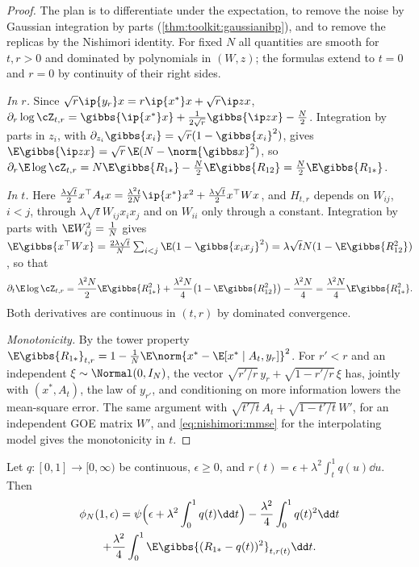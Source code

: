\begin{refsection}
\begin{proof}
The plan is to differentiate under the expectation, to remove the noise by Gaussian integration by parts (\cref{thm:toolkit:gaussianibp}), and to remove the replicas by the Nishimori identity. For fixed $N$ all quantities are smooth for $t,r>0$ and dominated by polynomials in $(W,z)$; the formulas extend to $t=0$ and $r=0$ by continuity of their right sides.

\emph{In $r$.} Since $\sqrt r\ip{y_r}x=r\ip{x^*}x+\sqrt r\ip zx$, $\partial_r\log\cZ_{t,r}=\gibbs{\ip{x^*}x}+\frac1{2\sqrt r}\gibbs{\ip zx}-\frac N2$. Integration by parts in $z_i$, with $\partial_{z_i}\gibbs{x_i}=\sqrt r(1-\gibbs{x_i}^2)$, gives $\E\gibbs{\ip zx}=\sqrt r\,\E(N-\norm{\gibbs x}^2)$, so $\partial_r\E\log\cZ_{t,r}=N\E\gibbs{R_{1*}}-\frac N2\E\gibbs{R_{12}}=\frac N2\E\gibbs{R_{1*}}$.

\emph{In $t$.} Here $\frac{\lambda\sqrt t}2x^\top A_tx=\frac{\lambda^2t}{2N}\ip{x^*}x^2+\frac{\lambda\sqrt t}2x^\top Wx$, and $H_{t,r}$ depends on $W_{ij}$, $i<j$, through $\lambda\sqrt tW_{ij}x_ix_j$ and on $W_{ii}$ only through a constant. Integration by parts with $\E W_{ij}^2=\frac1N$ gives $\E\gibbs{x^\top Wx}=\frac{2\lambda\sqrt t}N\sum_{i<j}\E(1-\gibbs{x_ix_j}^2)=\lambda\sqrt tN(1-\E\gibbs{R_{12}^2})$, so that
\[
\partial_t\E\log\cZ_{t,r}=\frac{\lambda^2N}2\E\gibbs{R_{1*}^2}+\frac{\lambda^2N}4\bigl(1-\E\gibbs{R_{12}^2}\bigr)-\frac{\lambda^2N}4=\frac{\lambda^2N}4\E\gibbs{R_{1*}^2}.
\]
Both derivatives are continuous in $(t,r)$ by dominated convergence.

\emph{Monotonicity.} By the tower property $\E\gibbs{R_{1*}}_{t,r}=1-\frac1N\E\norm{x^*-\E[x^*\mid A_t,y_r]}^2$. For $r'<r$ and an independent $\xi\sim\Normal(0,I_N)$, the vector $\sqrt{r'/r}\,y_r+\sqrt{1-r'/r}\,\xi$ has, jointly with $(x^*,A_t)$, the law of $y_{r'}$, and conditioning on more information lowers the mean-square error. The same argument with $\sqrt{t'/t}\,A_t+\sqrt{1-t'/t}\,W'$, for an independent GOE matrix $W'$, and \eqref{eq:nishimori:mmse} for the interpolating model gives the monotonicity in $t$.
\end{proof}

\begin{proposition}\label{prop:nishimori:interpolation}
Let $q\colon[0,1]\to[0,\infty)$ be continuous, $\epsilon\ge0$, and $r(t)=\epsilon+\lambda^2\int_t^1q(u)\dd u$. Then
\begin{multline*}
\phi_N(1,\epsilon)=\psi\Bigl(\epsilon+\lambda^2\int_0^1q(t)\dd t\Bigr)-\frac{\lambda^2}4\int_0^1q(t)^2\dd t\\
+\frac{\lambda^2}4\int_0^1\E\gibbs{(R_{1*}-q(t))^2}_{t,r(t)}\dd t.
\end{multline*}
\end{proposition}


\end{refsection}
